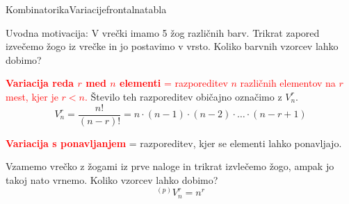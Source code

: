 \begin{priprava}{}{}{Kombinatorika}{Variacije}{frontalna}{tabla}

Uvodna motivacija: V vrečki imamo 5 žog različnih barv. Trikrat zapored izvečemo žogo iz vrečke in jo postavimo v vrsto. Koliko barvnih vzorcev lahko dobimo? 

\textcolor{red}{\textbf{Variacija reda $ r $ med $ n $ elementi} = razporeditev $ n $ različnih elementov na $ r $ mest, kjer je $ r < n $.}
Število teh razporeditev običajno označimo z $ V^r_n $.
$$ V^r_n = \frac{n!}{(n - r)!} = n \cdot (n - 1) \cdot (n - 2) \cdot \ldots \cdot (n - r + 1) $$

\textcolor{red}{\textbf{Variacija s ponavljanjem}} = razporeditev, kjer se elementi lahko ponavljajo.

Vzamemo vrečko z žogami iz prve naloge in trikrat izvlečemo žogo, ampak jo takoj nato vrnemo. Koliko vzorcev lahko dobimo? 
$$ ^{(p)}V^r_n = n^r $$


    
\end{priprava}
